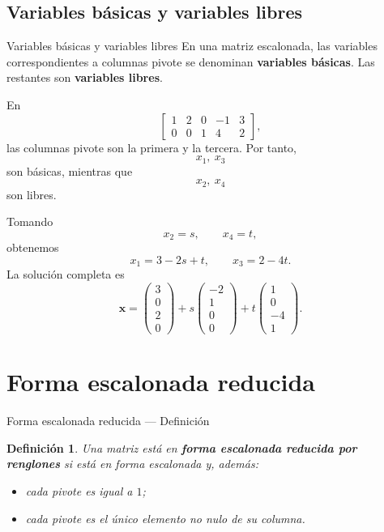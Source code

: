 \documentclass[aspectratio=169,11pt]{beamer}
\newtheorem{definicion}{Definición}[section]
\theoremstyle{remark}
\begin{document}
\subsection*{Variables básicas y variables libres}
\begin{frame}[allowframebreaks]{Variables básicas y variables libres}
\footnotesize
En una matriz escalonada, las variables correspondientes a columnas pivote se denominan \textbf{variables básicas}. Las restantes son \textbf{variables libres}.

En
\[
\left[
\begin{array}{cccc|c}
1&2&0&-1&3\\
0&0&1&4&2
\end{array}
\right],
\]
las columnas pivote son la primera y la tercera. Por tanto,
\[
x_1,\ x_3
\]
son básicas, mientras que
\[
x_2,\ x_4
\]
son libres.

Tomando
\[
x_2=s,\qquad x_4=t,
\]
obtenemos
\[
x_1=3-2s+t,\qquad x_3=2-4t.
\]
La solución completa es
\[
\mathbf{x}=
\begin{pmatrix}3\\0\\2\\0\end{pmatrix}
+s\begin{pmatrix}-2\\1\\0\\0\end{pmatrix}
+t\begin{pmatrix}1\\0\\-4\\1\end{pmatrix}.
\]
\end{frame}

\section*{Forma escalonada reducida}
\begin{frame}[shrink=5]{Forma escalonada reducida — Definición}
\footnotesize
\begin{definicion}
Una matriz está en \textbf{forma escalonada reducida por renglones} si está en forma escalonada y, además:
\begin{itemize}
\item cada pivote es igual a $1$;
\item cada pivote es el único elemento no nulo de su columna.
\end{itemize}
\end{definicion}
\end{frame}
\end{document}
